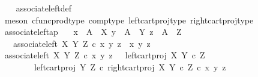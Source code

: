 \begin{isabellebody}
%
\isadelimproof
\ \ %
\endisadelimproof
%
\isatagproof
{}\isamarkupfalse%
\ associate{\isacharunderscore}{\kern0pt}left{\isacharunderscore}{\kern0pt}def\isanewline
\ \ \isamarkupfalse%
\ {\isacharparenleft}{\kern0pt}meson\ cfunc{\isacharunderscore}{\kern0pt}prod{\isacharunderscore}{\kern0pt}type\ comp{\isacharunderscore}{\kern0pt}type\ left{\isacharunderscore}{\kern0pt}cart{\isacharunderscore}{\kern0pt}proj{\isacharunderscore}{\kern0pt}type\ right{\isacharunderscore}{\kern0pt}cart{\isacharunderscore}{\kern0pt}proj{\isacharunderscore}{\kern0pt}type{\isacharparenright}{\kern0pt}%
\endisatagproof
{\isafoldproof}%
%
\isadelimproof
\isanewline
%
\endisadelimproof
\isanewline
{}\isamarkupfalse%
\ associate{\isacharunderscore}{\kern0pt}left{\isacharunderscore}{\kern0pt}ap{\isacharcolon}{\kern0pt}\isanewline
\ \ \ {\isachardoublequoteopen}x\ {\isacharcolon}{\kern0pt}\ A\ {\isasymrightarrow}\ X{\isachardoublequoteclose}\ {\isachardoublequoteopen}y\ {\isacharcolon}{\kern0pt}\ A\ {\isasymrightarrow}\ Y{\isachardoublequoteclose}\ {\isachardoublequoteopen}z\ {\isacharcolon}{\kern0pt}\ A\ {\isasymrightarrow}\ Z{\isachardoublequoteclose}\isanewline
\ \ \ {\isachardoublequoteopen}associate{\isacharunderscore}{\kern0pt}left\ X\ Y\ Z\ {\isasymcirc}\isactrlsub c\ {\isasymlangle}x{\isacharcomma}{\kern0pt}\ {\isasymlangle}y{\isacharcomma}{\kern0pt}\ z{\isasymrangle}{\isasymrangle}\ {\isacharequal}{\kern0pt}\ {\isasymlangle}{\isasymlangle}x{\isacharcomma}{\kern0pt}\ y{\isasymrangle}{\isacharcomma}{\kern0pt}\ z{\isasymrangle}{\isachardoublequoteclose}\isanewline
%
\isadelimproof
%
\endisadelimproof
%
\isatagproof
{}\isamarkupfalse%
\ {\isacharminus}{\kern0pt}\isanewline
\ \ \isamarkupfalse%
\ {\isachardoublequoteopen}associate{\isacharunderscore}{\kern0pt}left\ X\ Y\ Z\ {\isasymcirc}\isactrlsub c\ {\isasymlangle}x{\isacharcomma}{\kern0pt}\ {\isasymlangle}y{\isacharcomma}{\kern0pt}\ z{\isasymrangle}{\isasymrangle}\ \ {\isacharequal}{\kern0pt}\ {\isasymlangle}{\isasymlangle}left{\isacharunderscore}{\kern0pt}cart{\isacharunderscore}{\kern0pt}proj\ X\ {\isacharparenleft}{\kern0pt}Y\ {\isasymtimes}\isactrlsub c\ Z{\isacharparenright}{\kern0pt}{\isacharcomma}{\kern0pt}\isanewline
\ \ \ \ \ \ \ \ left{\isacharunderscore}{\kern0pt}cart{\isacharunderscore}{\kern0pt}proj\ Y\ Z\ {\isasymcirc}\isactrlsub c\ right{\isacharunderscore}{\kern0pt}cart{\isacharunderscore}{\kern0pt}proj\ X\ {\isacharparenleft}{\kern0pt}Y\ {\isasymtimes}\isactrlsub c\ Z{\isacharparenright}{\kern0pt}{\isasymrangle}\ {\isasymcirc}\isactrlsub c\ {\isasymlangle}x{\isacharcomma}{\kern0pt}\ {\isasymlangle}y{\isacharcomma}{\kern0pt}\ z{\isasymrangle}{\isasymrangle}{\isacharcomma}{\kern0pt}\isanewline

\end{isabellebody}
